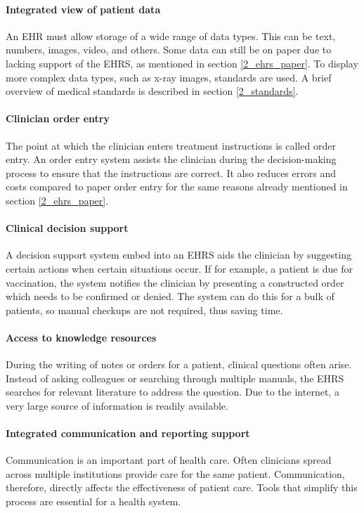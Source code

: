     \paragraph{Integrated view of patient data} An EHR must allow storage of a wide range of data types. This can be text, numbers, images, video, and others. Some data can still be on paper due to lacking support of the EHRS, as mentioned in section \ref{2_ehrs_paper}. To display more complex data types, such as x-ray images, standards are used. A brief overview of medical standards is described in section \ref{2_standards}. %

    \paragraph{Clinician order entry} The point at which the clinician enters treatment instructions is called order entry. An order entry system assists the clinician during the decision-making process to ensure that the instructions are correct. It also reduces errors and costs compared to paper order entry for the same reasons already mentioned in section \ref{2_ehrs_paper}. %

    \paragraph{Clinical decision support} A decision support system embed into an EHRS aids the clinician by suggesting certain actions when certain situations occur. If for example, a patient is due for vaccination, the system notifies the clinician by presenting a constructed order which needs to be confirmed or denied. The system can do this for a bulk of patients, so manual checkups are not required, thus saving time.

    \paragraph{Access to knowledge resources} During the writing of notes or orders for a patient, clinical questions often arise. Instead of asking colleagues or searching through multiple manuals, the EHRS searches for relevant literature to address the question. Due to the internet, a very large source of information is readily available.

    \paragraph{Integrated communication and reporting support} Communication is an important part of health care. Often clinicians spread across multiple institutions provide care for the same patient. Communication, therefore, directly affects the effectiveness of patient care. Tools that simplify this process are essential for a health system. 

